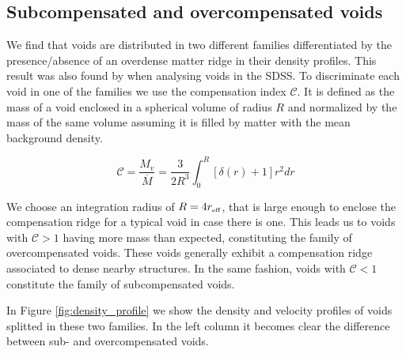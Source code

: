 \documentclass[a4,useAMS,usenatbib,usegraphicx]{mn2e}
\newcommand{\eq}[2]{\begin{equation} \label{eq:#1} #2 \end{equation}}
\newcommand{\reff}{{\ifmmode{r_{\mbox{\tiny eff}}}\else{$r_{\mbox{\tiny eff}}$}\fi}}
\begin{document}
\subsection{Subcompensated and overcompensated voids}
\label{subsec:enclosedmass}

We find that voids are distributed in two different families
differentiated by the 
presence/absence of an overdense matter ridge in their density
profiles. This result was also found by \citet{Ceccarelli13} when analysing
voids in the SDSS.
To discriminate each void in one of the families we use the
compensation  index $\mathcal{C}$.
It is defined as the mass of a void enclosed in a spherical volume of
radius $R$ and normalized by the mass of the same volume assuming
it is filled by matter with the mean background density.

\eq{compensation}
{\mathcal{C} = \frac{M_v}{\overline{M}} = \frac{3}{2R^{3}} \int_0^{R} [\delta(r) + 1] r^2 dr}

We choose an integration radius of $R=4\reff$, that is large enough to 
enclose the compensation ridge for a typical void in case there is one. 
This leads us to voids with $\mathcal{C}>1$ having more mass than expected, 
constituting the family of overcompensated voids. 
These voids generally  exhibit a compensation ridge associated to
dense nearby structures. 
In the same fashion, voids with $\mathcal{C}<1$ constitute the family
of  subcompensated voids. 

In Figure \ref{fig:density_profile} we show the density and velocity profiles
of voids splitted in these two families. 
In the left column it becomes clear the difference between sub- and
overcompensated voids.
\end{document}
